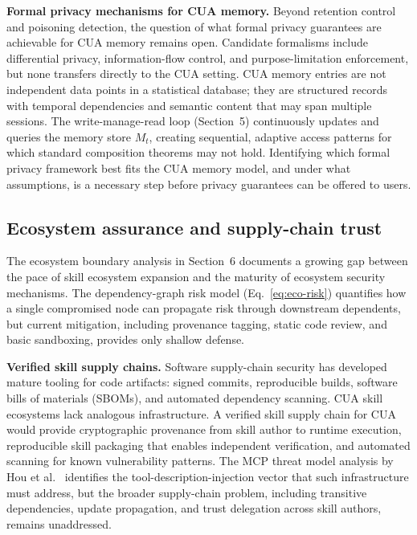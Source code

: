 \smallskip
\noindent\textbf{Formal privacy mechanisms for CUA memory.}
Beyond retention control and poisoning detection, the question of what formal privacy guarantees are achievable for CUA memory remains open. Candidate formalisms include differential privacy, information-flow control, and purpose-limitation enforcement, but none transfers directly to the CUA setting. CUA memory entries are not independent data points in a statistical database; they are structured records with temporal dependencies and semantic content that may span multiple sessions. The write-manage-read loop (Section~5) continuously updates and queries the memory store $M_t$, creating sequential, adaptive access patterns for which standard composition theorems may not hold. Identifying which formal privacy framework best fits the CUA memory model, and under what assumptions, is a necessary step before privacy guarantees can be offered to users.

\subsection{Ecosystem assurance and supply-chain trust}
\label{sec:future-ecosystem}

The ecosystem boundary analysis in Section~6 documents a growing gap between the pace of skill ecosystem expansion and the maturity of ecosystem security mechanisms. The dependency-graph risk model (Eq.~\ref{eq:eco-risk}) quantifies how a single compromised node can propagate risk through downstream dependents, but current mitigation, including provenance tagging, static code review, and basic sandboxing, provides only shallow defense.

\smallskip
\noindent\textbf{Verified skill supply chains.}
Software supply-chain security has developed mature tooling for code artifacts: signed commits, reproducible builds, software bills of materials (SBOMs), and automated dependency scanning. CUA skill ecosystems lack analogous infrastructure. A verified skill supply chain for CUA would provide cryptographic provenance from skill author to runtime execution, reproducible skill packaging that enables independent verification, and automated scanning for known vulnerability patterns. The MCP threat model analysis by Hou et al.~\cite{hou2025mcp} identifies the tool-description-injection vector that such infrastructure must address, but the broader supply-chain problem, including transitive dependencies, update propagation, and trust delegation across skill authors, remains unaddressed.

